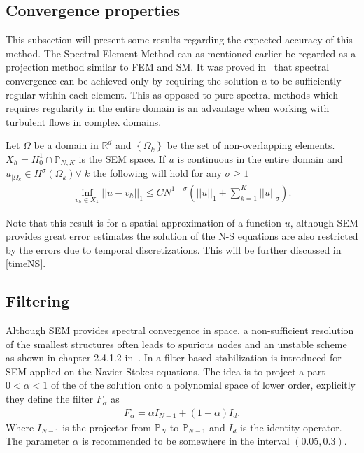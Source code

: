 
\subsection{Convergence properties}
This subsection will present some results regarding the expected accuracy of this method.
The Spectral Element Method can as mentioned earlier be regarded as a projection 
method similar to FEM and SM. 
It was proved in~\cite{MPR1987} that spectral convergence can be achieved only by requiring the solution
$u$ to be sufficiently regular within each element. This as opposed to pure spectral methods which
requires regularity in the entire domain is an advantage when working with turbulent flows 
in complex domains. 
\begin{theorem}
    Let $\Omega$ be a domain in $\mathbb{R}^d$ and $\left\{ \Omega_k \right\}$ 
    be the set of non-overlapping elements. $X_h = H^1_0\cap\mathbb{P}_{N,K}$ is the SEM space. If $u$ is continuous in the entire domain 
    and $u_{|\Omega_k} \in H^{\sigma}(\Omega_k) \forall \; k $ the following will hold for 
    any $\sigma \ge 1$
\begin{align}
    \inf_{v_{h}\in X_{k}}||u-v_h||_1 \le CN^{1-\sigma}\left( ||u||_1 + \sum_{k=1}^{K}||u||_{\sigma} \right).
\end{align}
    \label{thm:semconvergence}
\end{theorem}
%
Note that this result is for a spatial approximation of a function $u$, although SEM provides 
great error estimates the solution of the N-S equations are also restricted by the errors due to 
temporal discretizations. This will be further discussed in \cref{timeNS}.
\subsection{Filtering} \label{filtering}
Although SEM provides spectral convergence in space,
a non-sufficient resolution of the smallest structures
often leads to spurious nodes and an unstable scheme 
as shown in chapter 2.4.1.2 in~\cite{Karniadakis}. In \cite{FischerMullen} a filter-based 
stabilization is introduced for SEM applied on 
the Navier-Stokes equations. The idea is to project a part $ 0 <\alpha < 1$ 
of the of the solution onto a polynomial space of lower order, 
explicitly they define the filter $F_{\alpha}$ as 
%
\begin{align}
    F_{\alpha}= \alpha I_{N-1}  + (1-\alpha) I_d.
    \label{eq:filter}
\end{align}
%
Where $I_{N-1}$ is the projector from $\mathbb{P}_N$ to $\mathbb{P}_{N-1}$ and $ I_d$ is the identity operator.
The parameter $\alpha$ is recommended to be somewhere in the interval $(0.05,0.3)$.

